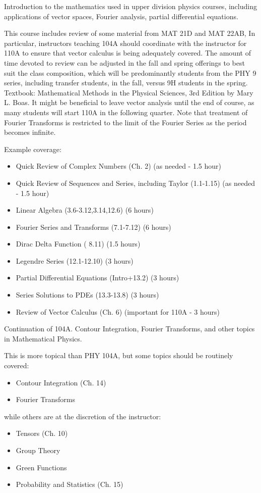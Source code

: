 \documentclass[12pt]{article}
\begin{document}
\vskip 1cm
Introduction to the mathematics used in upper division physics
courses, including applications of vector spaces, Fourier analysis,
partial differential equations.

This course includes review of some material from MAT 21D and MAT
22AB, In particular, instructors teaching 104A should coordinate with
the instructor for 110A to ensure that vector calculus is being
adequately covered.  The amount of time devoted to review can be
adjusted in the fall and spring offerings to best suit the class
composition, which will be predominantly students from the PHY 9
series, including transfer students, in the fall, versus 9H students
in the spring.  Textbook: Mathematical Methods in the Physical
Sciences, 3rd Edition by Mary L. Boas.  It might be beneficial to
leave vector analysis until the end of course, as many students will
start 110A in the following quarter.  Note that treatment of Fourier
Transforms is restricted to the limit of the Fourier Series as the period becomes
infinite.

\begin{samepage}
Example coverage:
\begin{itemize}
\item Quick Review of Complex Numbers (Ch. 2) (as needed - 1.5 hour)
\item Quick Review of Sequences and Series, including Taylor (1.1-1.15) (as needed - 1.5 hour)
\item Linear Algebra (3.6-3.12,3.14,12.6) (6 hours)
\item Fourier Series and Transforms (7.1-7.12) (6 hours)
\item Dirac Delta Function ( 8.11) (1.5 hours)
\item Legendre Series (12.1-12.10) (3 hours)
\item Partial Differential Equations (Intro+13.2) (3 hours)
\item Series Solutions to PDEs (13.3-13.8) (3 hours)
\item Review of Vector Calculus (Ch. 6) (important for 110A - 3 hours)
\end{itemize}
\end{samepage}

\vskip 1cm
Continuation of 104A.  Contour Integration, Fourier Transforms, and other topics in Mathematical Physics.

This is more topical than PHY 104A, but some topics should be routinely covered:
\begin{itemize}
 \item Contour Integration (Ch. 14)
 \item Fourier Transforms
\end{itemize}
while others are at the discretion of the instructor:
\begin{itemize}
 \item Tensors (Ch. 10)
 \item Group Theory
 \item Green Functions
 \item Probability and Statistics (Ch. 15)
\end{itemize}
\end{document}
